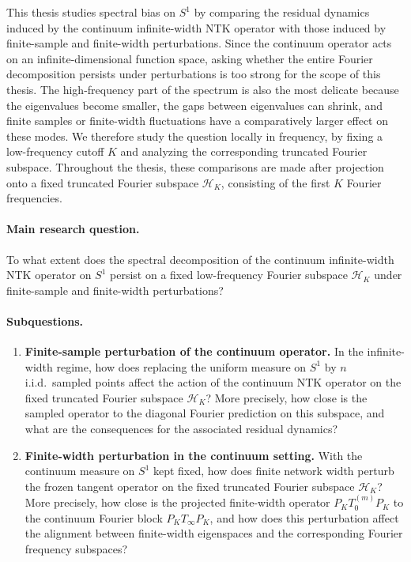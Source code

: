 This thesis studies spectral bias on \(S^1\) by comparing the residual dynamics
induced by the continuum infinite-width NTK operator with those induced by
finite-sample and finite-width perturbations. Since the continuum operator acts
on an infinite-dimensional function space, asking whether the entire Fourier
decomposition persists under perturbations is too strong for the scope of this
thesis. The high-frequency part of the spectrum is also the most delicate because the
eigenvalues become smaller, the gaps between eigenvalues can shrink, and finite samples or
finite-width fluctuations have a comparatively larger effect on these modes. We
therefore study the question locally in frequency, by fixing a low-frequency
cutoff \(K\) and analyzing the corresponding truncated Fourier subspace.
Throughout the thesis, these comparisons are made after projection onto a fixed
truncated Fourier subspace \(\mathcal H_K\), consisting of the first \(K\)
Fourier frequencies.

\paragraph{Main research question.}
To what extent does the spectral decomposition of the continuum infinite-width
NTK operator on \(S^1\) persist on a fixed low-frequency Fourier subspace
\(\mathcal H_K\) under finite-sample and finite-width perturbations?

\paragraph{Subquestions.}
\begin{enumerate}
	\item[(Q1)] \textbf{Finite-sample perturbation of the continuum operator.}
	      In the infinite-width regime, how does replacing the uniform measure
	      on \(S^1\) by \(n\) i.i.d.\ sampled points affect the action of the
	      continuum NTK operator on the fixed truncated Fourier subspace
	      \(\mathcal H_K\)?
	      More precisely, how close is the sampled operator to the diagonal
	      Fourier prediction on this subspace, and what are the consequences
	      for the associated residual dynamics?
	\item[(Q2)] \textbf{Finite-width perturbation in the continuum setting.}
	      With the continuum measure on \(S^1\) kept fixed, how does finite
	      network width perturb the frozen tangent operator on the fixed
	      truncated Fourier subspace \(\mathcal H_K\)?
	      More precisely, how close is the projected finite-width operator
	      \(P_KT_0^{(m)}P_K\) to the continuum Fourier block
	      \(P_KT_\infty P_K\), and how does this perturbation affect the
	      alignment between finite-width eigenspaces and the corresponding
	      Fourier frequency subspaces?
\end{enumerate}

